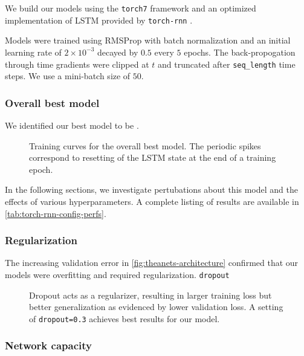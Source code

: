 We build our models using the \texttt{torch7} framework and
an optimized implementation of LSTM provided by \texttt{torch-rnn} .

Models were trained using RMSProp  with batch normalization 
and an initial learning rate of $2 \times 10^{-3}$ decayed by $0.5$ every $5$
epochs. The back-propogation through time gradients were clipped
at $t$  and truncated after \texttt{seq\_length} time steps.
We use a mini-batch size of $50$.

\subsubsection{Overall best model}

We identified our best model to be .

\begin{figure}[tb]
  \centering
  
  \caption{Training curves for the overall best model. The periodic spikes correspond
  to resetting of the LSTM state at the end of a training epoch.}
  \label{fig:torch-rnn-best-model-trace}
\end{figure}

In the following sections, we investigate pertubations about this model and the
effects of various hyperparameters. A complete listing of results are available
in \cref{tab:torch-rnn-config-perfs}.

\subsubsection{Regularization}

The increasing validation error in \cref{fig:theanets-architecture} confirmed
that our models were overfitting and required regularization. \texttt{dropout}

\begin{figure}[tb]
  \centering
  
  \caption{Dropout acts as a regularizer, resulting in larger training loss
  but better generalization as evidenced by lower validation loss. A setting of
\texttt{dropout=0.3} achieves best results for our model.}
  \label{fig:torch-rnn-dropout}
\end{figure}


\subsubsection{Network capacity}

